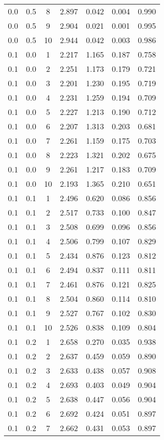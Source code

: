 \begin{tabular}{|c|c|c|c|c|c|c|}
0.0 & 0.5 & 8 & 2.897 & 0.042 & 0.004 & 0.990 \\
0.0 & 0.5 & 9 & 2.904 & 0.021 & 0.001 & 0.995 \\
0.0 & 0.5 & 10 & 2.944 & 0.042 & 0.003 & 0.986 \\
0.1 & 0.0 & 1 & 2.217 & 1.165 & 0.187 & 0.758 \\
0.1 & 0.0 & 2 & 2.251 & 1.173 & 0.179 & 0.721 \\
0.1 & 0.0 & 3 & 2.201 & 1.230 & 0.195 & 0.719 \\
0.1 & 0.0 & 4 & 2.231 & 1.259 & 0.194 & 0.709 \\
0.1 & 0.0 & 5 & 2.227 & 1.213 & 0.190 & 0.712 \\
0.1 & 0.0 & 6 & 2.207 & 1.313 & 0.203 & 0.681 \\
0.1 & 0.0 & 7 & 2.261 & 1.159 & 0.175 & 0.703 \\
0.1 & 0.0 & 8 & 2.223 & 1.321 & 0.202 & 0.675 \\
0.1 & 0.0 & 9 & 2.261 & 1.217 & 0.183 & 0.709 \\
0.1 & 0.0 & 10 & 2.193 & 1.365 & 0.210 & 0.651 \\
0.1 & 0.1 & 1 & 2.496 & 0.620 & 0.086 & 0.856 \\
0.1 & 0.1 & 2 & 2.517 & 0.733 & 0.100 & 0.847 \\
0.1 & 0.1 & 3 & 2.508 & 0.699 & 0.096 & 0.856 \\
0.1 & 0.1 & 4 & 2.506 & 0.799 & 0.107 & 0.829 \\
0.1 & 0.1 & 5 & 2.434 & 0.876 & 0.123 & 0.812 \\
0.1 & 0.1 & 6 & 2.494 & 0.837 & 0.111 & 0.811 \\
0.1 & 0.1 & 7 & 2.461 & 0.876 & 0.121 & 0.825 \\
0.1 & 0.1 & 8 & 2.504 & 0.860 & 0.114 & 0.810 \\
0.1 & 0.1 & 9 & 2.527 & 0.767 & 0.102 & 0.830 \\
0.1 & 0.1 & 10 & 2.526 & 0.838 & 0.109 & 0.804 \\
0.1 & 0.2 & 1 & 2.658 & 0.270 & 0.035 & 0.938 \\
0.1 & 0.2 & 2 & 2.637 & 0.459 & 0.059 & 0.890 \\
0.1 & 0.2 & 3 & 2.633 & 0.438 & 0.057 & 0.908 \\
0.1 & 0.2 & 4 & 2.693 & 0.403 & 0.049 & 0.904 \\
0.1 & 0.2 & 5 & 2.638 & 0.447 & 0.056 & 0.904 \\
0.1 & 0.2 & 6 & 2.692 & 0.424 & 0.051 & 0.897 \\
0.1 & 0.2 & 7 & 2.662 & 0.431 & 0.053 & 0.897 \\

\end{tabular}
